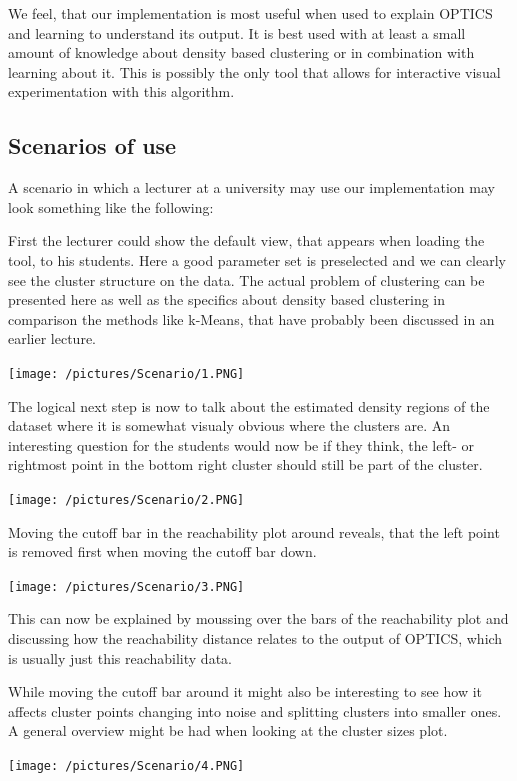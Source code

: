 \documentclass{vgtc} %
\begin{document}
We feel, that our implementation\cite{Our_Implementation} is most useful when used to explain OPTICS and learning to understand its output. It is best used with at least a small amount of knowledge about density based clustering or in combination with learning about it. This is possibly the only tool that allows for interactive visual experimentation with this algorithm.

\subsection{Scenarios of use}

A scenario in which a lecturer at a university may use our implementation may look something like the following:

First the lecturer could show the default view, that appears when loading the tool, to his students. Here a good parameter set is preselected and we can clearly see the cluster structure on the data. The actual problem of clustering can be presented here as well as the specifics about density based clustering in comparison the methods like k-Means, that have probably been discussed in an earlier lecture.

\noindent
\texttt{[image: /pictures/Scenario/1.PNG]}

The logical next step is now to talk about the estimated density regions of the dataset where it is somewhat visualy obvious where the clusters are. An interesting question for the students would now be if they think, the left- or rightmost point in the bottom right cluster should still be part of the cluster.

\noindent
\texttt{[image: /pictures/Scenario/2.PNG]}

Moving the cutoff bar in the reachability plot around reveals, that the left point is removed first when moving the cutoff bar down.

\noindent
\texttt{[image: /pictures/Scenario/3.PNG]}

This can now be explained by moussing over the bars of the reachability plot and discussing how the reachability distance relates to the output of OPTICS, which is usually just this reachability data.

While moving the cutoff bar around it might also be interesting to see how it affects cluster points changing into noise and splitting clusters into smaller ones. A general overview might be had when looking at the cluster sizes plot.

\noindent
\texttt{[image: /pictures/Scenario/4.PNG]}
\end{document}
